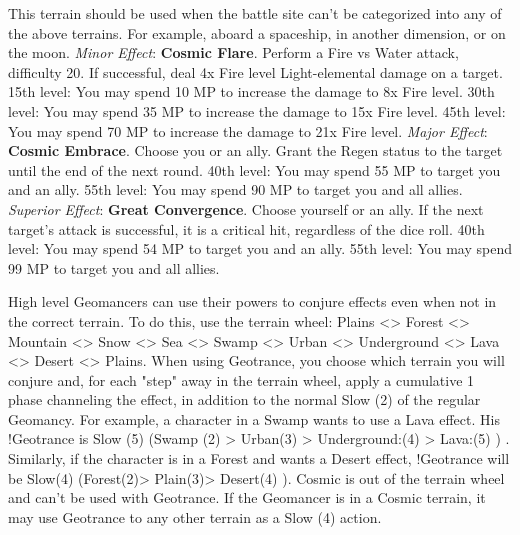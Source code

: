 \begin{multicols}{2}
    \ferrum

    This terrain should be used when the battle site can’t be categorized into any of the above terrains. For example, aboard a spaceship, in another dimension, or on the moon.
	\textit{Minor Effect}: \textbf{Cosmic Flare}. Perform a Fire vs Water attack, difficulty 20. If successful, deal 4x Fire level Light-elemental damage on a target. 15th level: You may spend 10 MP to increase the damage to 8x Fire level. 30th level: You may spend 35 MP to increase the damage to 15x Fire level. 45th level: You may spend 70 MP to increase the damage to 21x Fire level.
	\textit{Major Effect}: \textbf{Cosmic Embrace}. Choose you or an ally. Grant the Regen status to the target until the end of the next round. 40th level: You may spend 55 MP to target you and an ally. 55th level: You may spend 90 MP to target you and all allies.
	\textit{Superior Effect}: \textbf{Great Convergence}. Choose yourself or an ally. If the next target’s attack is successful, it is a critical hit, regardless of the dice roll. 40th level: You may spend 54 MP to target you and an ally. 55th level: You may spend 99 MP to target you and all allies.
\end{multicols}
 
\ferrum

\begin{multicols}{2}

	High level Geomancers can use their powers to conjure effects even when not in the correct terrain. To do this, use the terrain wheel: Plains <> Forest <> Mountain <> Snow <> Sea <> Swamp <> Urban <> Underground <> Lava <> Desert <> Plains. When using Geotrance, you choose which terrain you will conjure and, for each "step" away in the terrain wheel, apply a cumulative 1 phase channeling the effect, in addition to the normal Slow (2) of the regular Geomancy. For example, a character in a Swamp wants to use a Lava effect. His !Geotrance is Slow (5) (Swamp (2) > Urban(3) > Underground:(4) > Lava:(5) ) . Similarly, if the character is in a Forest and wants a Desert effect, !Geotrance will be Slow(4) (Forest(2)> Plain(3)> Desert(4) ). Cosmic is out of the terrain wheel and can’t be used with Geotrance. If the Geomancer is in a Cosmic terrain, it may use Geotrance to any other terrain as a Slow (4) action.
\end{multicols}